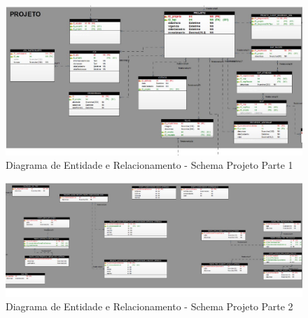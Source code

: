 \documentclass{acm_proc_article-sp}
\begin{document}
\begin{appendices}
\begin{figure}[h]
\centering %
\includegraphics[width=1\textwidth]{DER_projeto_p1.jpg} %
\caption{Diagrama de Entidade e Relacionamento - Schema Projeto Parte 1}
\end{figure}

\begin{figure}[h]
\centering %
\includegraphics[width=1\textwidth]{DER_projeto_p2.jpg} %
\caption{Diagrama de Entidade e Relacionamento - Schema Projeto Parte 2}
\end{figure}


\end{appendices}
\end{document}
